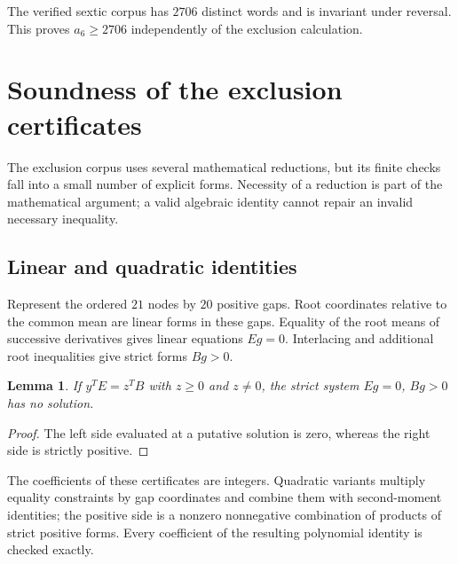 \documentclass[11pt]{article}
\newtheorem{lemma}[theorem]{Lemma}
\theoremstyle{definition}
\begin{document}
The verified sextic corpus has $2706$ distinct words and is invariant
under reversal. This proves $a_6\ge2706$ independently of the exclusion
calculation.

\section{Soundness of the exclusion certificates}

The exclusion corpus uses several mathematical reductions, but its finite
checks fall into a small number of explicit forms. Necessity of a
reduction is part of the mathematical argument; a valid algebraic identity
cannot repair an invalid necessary inequality.

\subsection{Linear and quadratic identities}
Represent the ordered $21$ nodes by $20$ positive gaps. Root coordinates
relative to the common mean are linear forms in these gaps. Equality of
the root means of successive derivatives gives linear equations $Eg=0$.
Interlacing and additional root inequalities give strict forms $Bg>0$.

\begin{lemma}\label{lem:farkas}
If $y^TE=z^TB$ with $z\ge0$ and $z\ne0$, the strict system
$Eg=0$, $Bg>0$ has no solution.
\end{lemma}
\begin{proof}
The left side evaluated at a putative solution is zero, whereas the right
side is strictly positive.
\end{proof}

The coefficients of these certificates are integers. Quadratic variants
multiply equality constraints by gap coordinates and combine them with
second-moment identities; the positive side is a nonzero nonnegative
combination of products of strict positive forms. Every coefficient of
the resulting polynomial identity is checked exactly.
\end{document}
